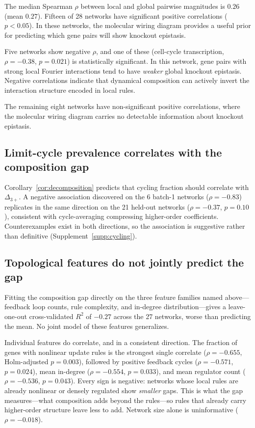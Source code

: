\documentclass[10pt]{article}
\begin{document}
The median Spearman $\rho$ between local and global pairwise
magnitudes is $0.26$ (mean $0.27$). Fifteen of 28 networks have
significant positive correlations ($p < 0.05$). In these networks,
the molecular wiring diagram provides a useful prior for predicting
which gene pairs will show knockout epistasis.

Five networks show negative $\rho$, and one of these
(cell-cycle transcription, $\rho = -0.38$, $p = 0.021$) is
statistically significant. In this network, gene pairs with strong
local Fourier interactions tend to have \emph{weaker} global knockout
epistasis. Negative correlations indicate that dynamical composition
can actively invert the interaction structure encoded in local rules.

The remaining eight networks have non-significant positive
correlations, where the molecular wiring diagram carries no detectable
information about knockout epistasis.


\subsection{Limit-cycle prevalence correlates with the composition gap}
\label{sec:cycling}

Corollary~\ref{cor:decomposition} predicts that cycling fraction
should correlate with $\Delta_{3+}$. A negative association
discovered on the 6 batch-1 networks ($\rho = -0.83$) replicates in
the same direction on the 21 held-out networks ($\rho = -0.37$,
$p = 0.10$), consistent with cycle-averaging compressing
higher-order coefficients. Counterexamples exist in both directions,
so the association is suggestive rather than definitive
(Supplement~\ref{supp:cycling}).


\subsection{Topological features do not jointly predict the gap}
\label{sec:blind-results}

Fitting the composition gap directly on the three feature families
named above---feedback loop counts, rule complexity, and in-degree
distribution---gives a leave-one-out cross-validated $R^2$ of $-0.27$
across the 27 networks, worse than predicting the mean. No joint model
of these features generalizes.

Individual features do correlate, and in a consistent direction. The
fraction of genes with nonlinear update rules is the strongest single
correlate ($\rho = -0.655$, Holm-adjusted $p = 0.003$), followed by
positive feedback cycles ($\rho = -0.571$, $p = 0.024$), mean
in-degree ($\rho = -0.554$, $p = 0.033$), and mean regulator count
($\rho = -0.536$, $p = 0.043$). Every sign is negative: networks whose
local rules are already nonlinear or densely regulated show
\emph{smaller} gaps. This is what the gap measures---what composition
adds beyond the rules---so rules that already carry higher-order
structure leave less to add. Network size alone is uninformative
($\rho = -0.018$).
\end{document}

